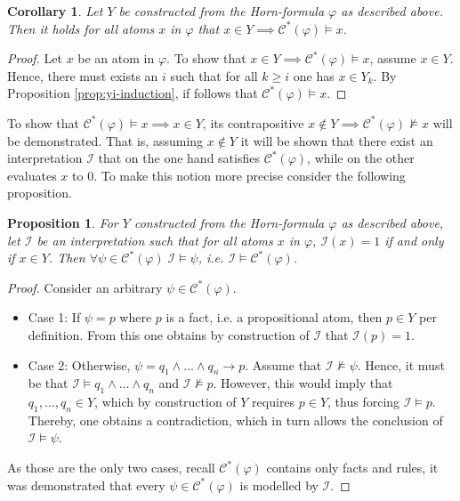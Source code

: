 \documentclass [11pt]{article}
\newtheorem{corollary}[theorem]{Corollary}
\newtheorem{proposition}[theorem]{Proposition}
\newcommand{\lto}{\rightarrow}
\newcommand{\nmodels}{\not\models}
\begin{document}
\begin{corollary} 
\label{cor:forth}
Let $Y$ be constructed from the Horn-formula $\varphi$ as described above. Then it holds for all atoms $x$ in $\varphi$ that $x \in Y \implies \mathcal{C}^*(\varphi) \models x$.
\end{corollary}
\begin{proof}
Let $x$ be an atom in $\varphi$. To show that $x \in Y \implies \mathcal{C}^*(\varphi) \models x$, assume $x \in Y$. Hence, there must exists an $i$ such that for all $k\geq i$ one has $x \in Y_k$. By Proposition \ref{prop:yi-induction}, if follows that $\mathcal{C}^*(\varphi)\models x$.
\end{proof}

\bigskip
To show that $\mathcal{C}^*(\varphi) \models x  \implies x \in Y$, its contrapositive  $x  \notin Y  \implies \mathcal{C}^*(\varphi) \nmodels x$ will be demonstrated. That is, assuming $x  \notin Y$ it will be shown that there exist an interpretation $\mathcal{I}$ that on the one hand satisfies $ \mathcal{C}^*(\varphi)$, while on the other evaluates $x$ to $0$. To make this notion more precise consider the following proposition.
\begin{proposition}
\label{prop:yi-model}
For $Y$ constructed from the Horn-formula $\varphi$ as described above,
let $\mathcal{I}$ be an interpretation such that for all atoms $x$ in $\varphi$,  $\mathcal{I}(x)=1$ if and only if $x \in Y$.
Then $\forall \psi \in \mathcal{C}^*(\varphi) \; \mathcal{I} \models \psi$, i.e. $ \mathcal{I} \models \mathcal{C}^*(\varphi)$.
\end{proposition}
\begin{proof}
Consider an arbitrary $ \psi \in \mathcal{C}^*(\varphi)$. 
\begin{itemize}
\item Case 1: If $\psi = p$ where $p$ is a fact, i.e. a propositional atom, then $p \in Y$ per definition. From this one obtains by construction of $\mathcal{I}$ that $\mathcal{I}(p)=1$. 
\item Case 2: Otherwise, $\psi = q_1 \land \dots \land q_n \lto p$. Assume that $\mathcal{I} \nmodels \psi$. Hence, it must be that
$\mathcal{I}\models q_1 \land \dots \land q_n $  and $\mathcal{I}\nmodels p $. However, this would imply that $q_1 , \dots , q_n \in Y$, which by construction of $Y$ requires $p \in Y$, thus forcing $\mathcal{I} \models p$. Thereby, one obtains a contradiction, which in turn allows the conclusion of $\mathcal{I} \models \psi$.
\end{itemize}
As those are the only two cases, recall $\mathcal{C}^*(\varphi)$ contains only facts and rules, it was demonstrated that every $\psi \in  \mathcal{C}^*(\varphi)$ is modelled by $\mathcal{I}$. 
\end{proof}
\end{document}
